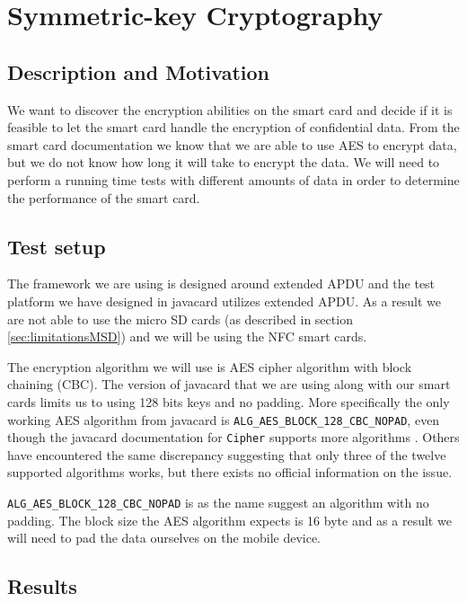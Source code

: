 \section{Symmetric-key Cryptography}
\label{sec:symmetricTest}
\subsection{Description and Motivation}
We want to discover the encryption abilities on the smart card and decide if it is feasible to let the smart card handle the encryption of confidential data. From the smart card documentation we know that we are able to use AES to encrypt data, but we do not know how long it will take to encrypt the data. We will need to perform a running time tests with different amounts of data in order to determine the performance of the smart card.

\subsection{Test setup}
The framework we are using is designed around extended APDU and the test platform we have designed in javacard utilizes extended APDU. As a result we are not able to use the micro SD cards (as described in section \ref{sec:limitationsMSD}) and we will be using the NFC smart cards.

The encryption algorithm we will use is AES cipher algorithm with block chaining (CBC). The version of javacard that we are using along with our smart cards limits us to using 128 bits keys and no padding. More specifically the only working AES algorithm from javacard is \texttt{ALG\_AES\_BLOCK\_128\_CBC\_NOPAD}, even though the javacard documentation for \texttt{Cipher} supports more algorithms \cite{javacardCipher}. Others have encountered the same discrepancy \cite{javacardCipherFail} suggesting that only three of the twelve supported algorithms works, but there exists no official information on the issue.

\texttt{ALG\_AES\_BLOCK\_128\_CBC\_NOPAD} is as the name suggest an algorithm with no padding. The block size the AES algorithm expects is 16 byte and as a result we will need to pad the data ourselves on the mobile device.

\subsection{Results}


